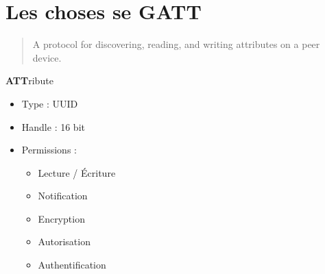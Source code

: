 \section{Les choses se GATT}

\begin{frame}
	\begin{quote}A protocol for discovering, reading, and writing attributes on a peer device.\end{quote}

	\begin{block}{\textbf{ATT}ribute}
		\begin{itemize}
			\item Type : UUID
			\item Handle : 16 bit
			\item Permissions :
				\begin{itemize}
					\item Lecture / Écriture
					\item Notification
					\item Encryption
					\item Autorisation
					\item Authentification
				\end{itemize}
		\end{itemize}
	\end{block}
\end{frame}

\begin{frame}
\end{frame}

\begin{frame}
\end{frame}
